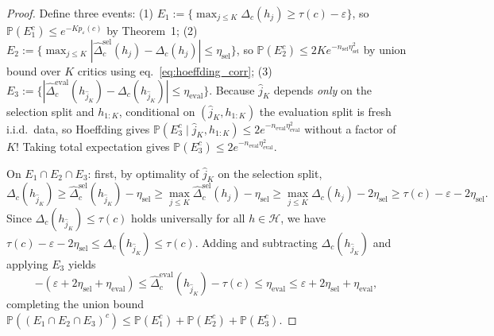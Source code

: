 \documentclass[11pt]{article}
\newcommand{\Prob}{\mathbb{P}}
\newcommand{\cH}{\mathcal{H}}
\begin{document}
\begin{proof}
Define three events:
(1) $E_1 := \{\max_{j \le K}\Delta_c(h_j) \ge \tau(c) - \varepsilon\}$, so $\Prob(E_1^c) \le e^{-K p_\varepsilon(c)}$ by Theorem~1;
(2) $E_2 := \{\max_{j \le K} |\widehat{\Delta}^{\mathrm{sel}}_c(h_j) - \Delta_c(h_j)| \le \eta_{\mathrm{sel}}\}$, so $\Prob(E_2^c) \le 2K e^{-n_{\mathrm{sel}}\eta_{\mathrm{sel}}^2}$ by union bound over $K$ critics using eq.~\eqref{eq:hoeffding_corr};
(3) $E_3 := \{|\widehat{\Delta}^{\mathrm{eval}}_c(h_{\hat{j}_K}) - \Delta_c(h_{\hat{j}_K})| \le \eta_{\mathrm{eval}}\}$. Because $\hat{j}_K$ depends \emph{only} on the selection split and $h_{1:K}$, conditional on $(\hat{j}_K, h_{1:K})$ the evaluation split is fresh i.i.d.\ data, so Hoeffding gives $\Prob(E_3^c \mid \hat{j}_K, h_{1:K}) \le 2e^{-n_{\mathrm{eval}}\eta_{\mathrm{eval}}^2}$ without a factor of $K$! Taking total expectation gives $\Prob(E_3^c) \le 2e^{-n_{\mathrm{eval}}\eta_{\mathrm{eval}}^2}$.

On $E_1 \cap E_2 \cap E_3$: first, by optimality of $\hat{j}_K$ on the selection split,
\begin{equation}
\Delta_c(h_{\hat{j}_K}) \ge \widehat{\Delta}^{\mathrm{sel}}_c(h_{\hat{j}_K}) - \eta_{\mathrm{sel}}
\ge \max_{j \le K} \widehat{\Delta}^{\mathrm{sel}}_c(h_j) - \eta_{\mathrm{sel}}
\ge \max_{j \le K} \Delta_c(h_j) - 2\eta_{\mathrm{sel}}
\ge \tau(c) - \varepsilon - 2\eta_{\mathrm{sel}}.
\end{equation}
Since $\Delta_c(h_{\hat{j}_K}) \le \tau(c)$ holds universally for all $h \in \cH$, we have $\tau(c) - \varepsilon - 2\eta_{\mathrm{sel}} \le \Delta_c(h_{\hat{j}_K}) \le \tau(c)$. Adding and subtracting $\Delta_c(h_{\hat{j}_K})$ and applying $E_3$ yields
\begin{equation}
-(\varepsilon + 2\eta_{\mathrm{sel}} + \eta_{\mathrm{eval}})
\le \widehat{\Delta}^{\mathrm{eval}}_c(h_{\hat{j}_K}) - \tau(c)
\le \eta_{\mathrm{eval}}
\le \varepsilon + 2\eta_{\mathrm{sel}} + \eta_{\mathrm{eval}},
\end{equation}
completing the union bound $\Prob((E_1 \cap E_2 \cap E_3)^c) \le \Prob(E_1^c) + \Prob(E_2^c) + \Prob(E_3^c)$.
\end{proof}
\end{document}
